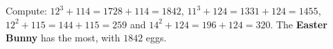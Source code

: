 Compute: $12^3+114=1728+114=1842$, $11^3+124=1331+124=1455$, $12^2+115=144+115=259$ and $14^2+124=196+124=320$. The \textbf{Easter Bunny} has the most, with $\boxed{1842}$ eggs.

